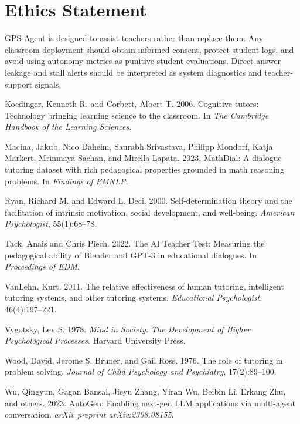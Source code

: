 \documentclass[11pt]{article}
\begin{document}
\section{Ethics Statement}
GPS-Agent is designed to assist teachers rather than replace them. Any classroom deployment should obtain informed consent, protect student logs, and avoid using autonomy metrics as punitive student evaluations. Direct-answer leakage and stall alerts should be interpreted as system diagnostics and teacher-support signals.

\begin{thebibliography}{}
Koedinger, Kenneth R. and Corbett, Albert T. 2006.
\newblock Cognitive tutors: Technology bringing learning science to the classroom.
\newblock In \emph{The Cambridge Handbook of the Learning Sciences}.

Macina, Jakub, Nico Daheim, Saurabh Srivastava, Philipp Mondorf, Katja Markert, Mrinmaya Sachan, and Mirella Lapata. 2023.
\newblock MathDial: A dialogue tutoring dataset with rich pedagogical properties grounded in math reasoning problems.
\newblock In \emph{Findings of EMNLP}.

Ryan, Richard M. and Edward L. Deci. 2000.
\newblock Self-determination theory and the facilitation of intrinsic motivation, social development, and well-being.
\newblock \emph{American Psychologist}, 55(1):68--78.

Tack, Anais and Chris Piech. 2022.
\newblock The AI Teacher Test: Measuring the pedagogical ability of Blender and GPT-3 in educational dialogues.
\newblock In \emph{Proceedings of EDM}.

VanLehn, Kurt. 2011.
\newblock The relative effectiveness of human tutoring, intelligent tutoring systems, and other tutoring systems.
\newblock \emph{Educational Psychologist}, 46(4):197--221.

Vygotsky, Lev S. 1978.
\newblock \emph{Mind in Society: The Development of Higher Psychological Processes}.
\newblock Harvard University Press.

Wood, David, Jerome S. Bruner, and Gail Ross. 1976.
\newblock The role of tutoring in problem solving.
\newblock \emph{Journal of Child Psychology and Psychiatry}, 17(2):89--100.

Wu, Qingyun, Gagan Bansal, Jieyu Zhang, Yiran Wu, Beibin Li, Erkang Zhu, and others. 2023.
\newblock AutoGen: Enabling next-gen LLM applications via multi-agent conversation.
\newblock \emph{arXiv preprint arXiv:2308.08155}.
\end{thebibliography}
\end{document}
